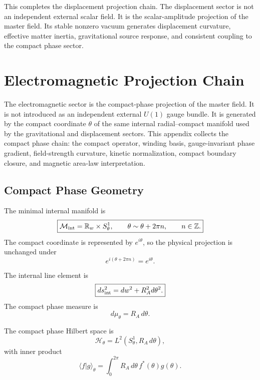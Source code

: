 \documentclass[11pt]{article}
\begin{document}
This completes the displacement projection chain. The displacement sector is not
an independent external scalar field. It is the scalar-amplitude projection of
the master field. Its stable nonzero vacuum generates displacement curvature,
effective matter inertia, gravitational source response, and consistent coupling
to the compact phase sector.

\section{Electromagnetic Projection Chain}
\label{sec:electromagnetic_projection_chain}

The electromagnetic sector is the compact-phase projection of the master field.
It is not introduced as an independent external \(U(1)\) gauge bundle. It is
generated by the compact coordinate \(\theta\) of the same internal
radial--compact manifold used by the gravitational and displacement sectors.
This appendix collects the compact phase chain: the compact operator, winding
basis, gauge-invariant phase gradient, field-strength curvature, kinetic
normalization, compact boundary closure, and magnetic area-law interpretation.

\subsection{Compact Phase Geometry}

The minimal internal manifold is
\begin{equation}
\boxed{
\mathcal M_{\rm int}
=
\mathbb R_w\times S^1_\theta,
\qquad
\theta\sim\theta+2\pi n,
\qquad
n\in\mathbb Z.
}
\end{equation}
The compact coordinate is represented by \(e^{i\theta}\), so the physical
projection is unchanged under
\begin{equation}
\boxed{
e^{i(\theta+2\pi n)}
=
e^{i\theta}.
}
\end{equation}

The internal line element is
\begin{equation}
\boxed{
ds_{\rm int}^2
=
dw^2+R_A^2d\theta^2.
}
\end{equation}
The compact phase measure is
\begin{equation}
\boxed{
d\mu_\theta
=
R_A\,d\theta.
}
\end{equation}

The compact phase Hilbert space is
\begin{equation}
\boxed{
\mathcal H_\theta
=
L^2(S^1_\theta,R_A\,d\theta),
}
\end{equation}
with inner product
\begin{equation}
\boxed{
\langle f|g\rangle_\theta
=
\int_0^{2\pi}
R_A\,d\theta\,
f^*(\theta)g(\theta).
}
\end{equation}
\end{document}
